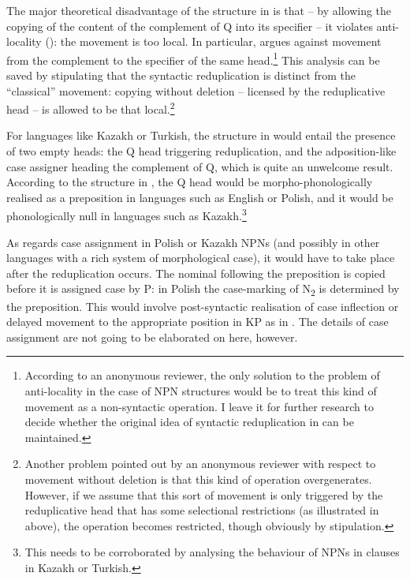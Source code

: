 \documentclass[output=paper]{langscibook}
\begin{document}
\noindent The major theoretical disadvantage of the structure in  is that – by allowing the copying of the content of the complement of Q into its specifier – it violates anti-locality (\citealt{Abels2003,grohmann2003prolific}): the movement is too local. In particular, \citet{Abels2003} argues against movement from the complement to the specifier of the same head.\footnote{According to an anonymous reviewer, the only solution to the problem of anti-locality in the case of NPN structures would be to treat this kind of movement as a non-syntactic operation. I leave it for further research to decide whether the original idea of syntactic reduplication in \cite{Travis2001,Travis2003} can be maintained.} This analysis can be saved by stipulating that the syntactic reduplication is distinct from the ``classical'' movement: copying without deletion – licensed by the reduplicative head – is allowed to be that local.\footnote{Another problem pointed out by an anonymous reviewer with respect to movement without deletion is that this kind of operation overgenerates. However, if we assume that this sort of movement is only triggered by the reduplicative head that has some selectional restrictions (as illustrated in  above), the operation becomes restricted, though obviously by stipulation.}

For languages like Kazakh or Turkish, the structure in  would entail the presence of two empty heads: the Q head triggering reduplication, and the adposition-like case assigner heading the complement of Q, which is quite an unwelcome result. According to the structure in , the Q head would be morpho-phonologically realised as a preposition in languages such as English or Polish, and it would be phonologically null in languages such as Kazakh.\footnote{This needs to be corroborated by analysing the behaviour of NPNs in clauses in Kazakh or Turkish.}

As regards case assignment in Polish or Kazakh NPNs (and possibly in other languages with a rich system of morphological case), it would have to take place after the reduplication occurs. The nominal following the preposition is copied before it is assigned case by P: in Polish the case-marking of N\textsubscript{2} is determined by the preposition. This would involve post-syntactic realisation of case inflection \citep{Sigurðsson2012} or delayed movement to the appropriate position in KP as in \citet{Caha2009}. The details of case assignment are not going to be elaborated on here, however.
\end{document}
